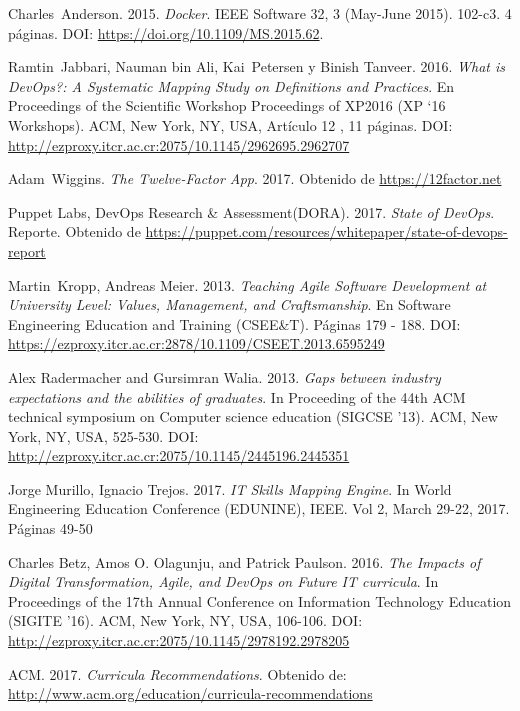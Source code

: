 \begin{thebibliography}{99}
Charles~Anderson. 2015. \emph{Docker}. IEEE Software 32, 3 (May-June 2015). 102-c3. 4 páginas.  DOI: \url{https://doi.org/10.1109/MS.2015.62}.

Ramtin~Jabbari, Nauman bin Ali, Kai~Petersen y Binish Tanveer. 2016. \emph{What is DevOps?: A Systematic Mapping Study on Definitions and Practices}. En Proceedings of the Scientific Workshop Proceedings of XP2016 (XP `16 Workshops). ACM, New York, NY, USA, Artículo 12 , 11 páginas. DOI: \url{http://ezproxy.itcr.ac.cr:2075/10.1145/2962695.2962707} 

Adam~Wiggins. \emph{The Twelve-Factor App}. 2017. Obtenido de \url{https://12factor.net}

Puppet Labs, DevOps Research \& Assessment(DORA). 2017. \emph{State of DevOps}. Reporte. Obtenido de \url{https://puppet.com/resources/whitepaper/state-of-devops-report} 


Martin~Kropp, Andreas Meier. 2013. \emph{Teaching Agile Software Development at University Level: Values, Management, and Craftsmanship}. En Software Engineering Education and Training (CSEE\&T). Páginas 179 - 188. DOI: \url{https://ezproxy.itcr.ac.cr:2878/10.1109/CSEET.2013.6595249}

Alex Radermacher and Gursimran Walia. 2013. \emph{Gaps between industry expectations and the abilities of graduates}. In Proceeding of the 44th ACM technical symposium on Computer science education (SIGCSE '13). ACM, New York, NY, USA, 525-530. DOI: \url{http://ezproxy.itcr.ac.cr:2075/10.1145/2445196.2445351}

Jorge Murillo, Ignacio Trejos. 2017. \emph{IT Skills Mapping Engine}. In World Engineering Education Conference (EDUNINE), IEEE. Vol 2, March 29-22, 2017. Páginas 49-50


Charles Betz, Amos O. Olagunju, and Patrick Paulson. 2016. \emph{The Impacts of Digital Transformation, Agile, and DevOps on Future IT curricula}. In Proceedings of the 17th Annual Conference on Information Technology Education (SIGITE '16). ACM, New York, NY, USA, 106-106. DOI: \url{http://ezproxy.itcr.ac.cr:2075/10.1145/2978192.2978205}

ACM. 2017. \emph{Curricula Recommendations}. Obtenido de: \url{http://www.acm.org/education/curricula-recommendations}


\end{thebibliography}
